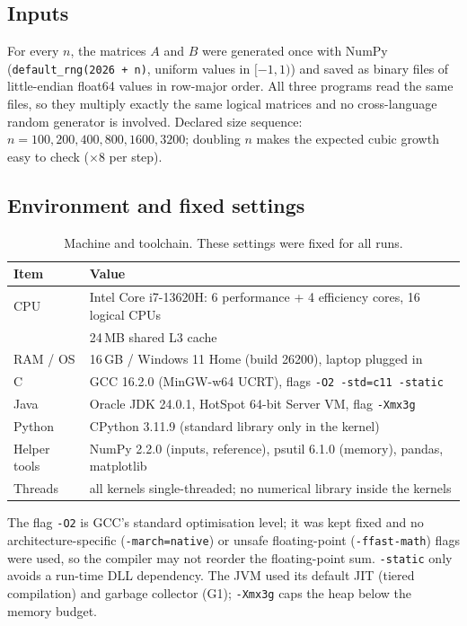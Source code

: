 \documentclass[11pt,a4paper]{article}
\begin{document}
\subsection{Inputs}
For every $n$, the matrices $A$ and $B$ were generated once with NumPy
(\texttt{default\_rng(2026 + n)}, uniform values in $[-1, 1)$) and saved as binary files
of little-endian float64 values in row-major order. All three programs read the same
files, so they multiply exactly the same logical matrices and no cross-language random
generator is involved. Declared size sequence: $n = 100, 200, 400, 800, 1600, 3200$;
doubling $n$ makes the expected cubic growth easy to check ($\times 8$ per step).

\needspace{0.25\textheight}
\subsection{Environment and fixed settings}
\begin{table}[H]
\centering\small
\begin{tabular}{ll}
\toprule
Item & Value \\
\midrule
CPU & Intel Core i7-13620H: 6 performance + 4 efficiency cores, 16 logical CPUs \\
    & 24\,MB shared L3 cache \cite{intel} \\
RAM / OS & 16\,GB / Windows 11 Home (build 26200), laptop plugged in \\
C & GCC 16.2.0 (MinGW-w64 UCRT), flags \texttt{-O2 -std=c11 -static} \\
Java & Oracle JDK 24.0.1, HotSpot 64-bit Server VM, flag \texttt{-Xmx3g} \\
Python & CPython 3.11.9 (standard library only in the kernel) \\
Helper tools & NumPy 2.2.0 (inputs, reference), psutil 6.1.0 (memory), pandas, matplotlib \\
Threads & all kernels single-threaded; no numerical library inside the kernels \\
\bottomrule
\end{tabular}
\caption{Machine and toolchain. These settings were fixed for all runs.}
\end{table}

The flag \texttt{-O2} is GCC's standard optimisation level; it was kept fixed and no
architecture-specific (\texttt{-march=native}) or unsafe floating-point
(\texttt{-ffast-math}) flags were used, so the compiler may not reorder the
floating-point sum. \texttt{-static} only avoids a run-time DLL dependency. The JVM
used its default JIT (tiered compilation) and garbage collector (G1); \texttt{-Xmx3g}
caps the heap below the memory budget.
\end{document}
